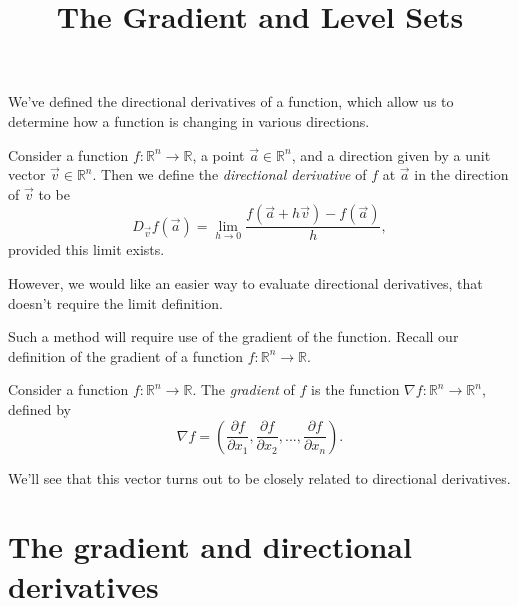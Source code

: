\documentclass{ximera}
\title{The Gradient and Level Sets}
\begin{document}
\begin{abstract}
\end{abstract}
\maketitle

We've defined the directional derivatives of a function, which allow us to determine how a function is changing in various directions.

\begin{definition}
Consider a function $f:\mathbb{R}^n\rightarrow\mathbb{R}$, a point $\vec{a}\in\mathbb{R}^n$, and a direction given by a unit vector $\vec{v}\in\mathbb{R}^n$. Then we define the \emph{directional derivative} of $f$ at $\vec{a}$ in the direction of $\vec{v}$ to be
\[
D_{\vec{v}}f(\vec{a}) = \lim_{h\rightarrow 0}\frac{f(\vec{a}+h\vec{v})-f(\vec{a})}{h},
\]
provided this limit exists.
\end{definition}

However, we would like an easier way to evaluate directional derivatives, that doesn't require the limit definition.

Such a method will require use of the gradient of the function. Recall our definition of the gradient of a function $f:\mathbb{R}^n\rightarrow\mathbb{R}$.

\begin{definition}
Consider a function $f:\mathbb{R}^n\rightarrow\mathbb{R}$. The \emph{gradient} of $f$ is the function $\nabla f:\mathbb{R}^n\rightarrow\mathbb{R}^n$, defined by
\[
\nabla f = \left(\frac{\partial f}{\partial x_1},\frac{\partial f}{\partial x_2},...,\frac{\partial f}{\partial x_n}\right).
\]
\end{definition}

We'll see that this vector turns out to be closely related to directional derivatives.

\section*{The gradient and directional derivatives}
\end{document}
